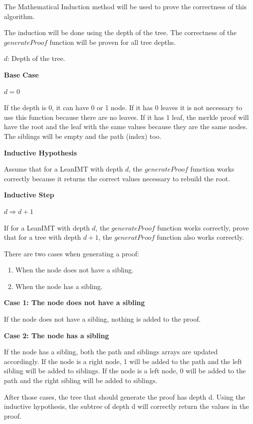 \documentclass{article}
\begin{document}
The Mathematical Induction method will be used to prove the correctness of this algorithm.

The induction will be done using the depth of the tree. The correctness of the $generateProof$ function will be proven for all tree depths.

$d$: Depth of the tree.

\textbf{Base Case}

$d = 0$

If the depth is 0, it can have 0 or 1 node.
If it has 0 leaves it is not necessary to use this function because there are no leaves.
If it has 1 leaf, the merkle proof will have the root and the leaf with the same values because they are the same nodes. The siblings will be empty and the path (index) too.

\textbf{Inductive Hypothesis}

Assume that for a LeanIMT with depth $d$, the $generateProof$ function works correctly because it returns the correct values necessary to rebuild the root.

\textbf{Inductive Step}

$d \Rightarrow d+1$

If for a LeanIMT with depth $d$, the $generateProof$ function works correctly, prove that for a tree with depth $d + 1$, the $generatProof$ function also works correctly.

There are two cases when generating a proof:

\begin{enumerate}
    \item When the node does not have a sibling.
    \item When the node has a sibling.
\end{enumerate}

\textbf{Case 1: The node does not have a sibling}

If the node does not have a sibling, nothing is added to the proof.

\textbf{Case 2: The node has a sibling}

If the node has a sibling, both the path and siblings arrays are updated accordingly.
If the node is a right node, 1 will be added to the path and the left sibling will be added to siblings.
If the node is a left node, 0 will be added to the path and the right sibling will be added to siblings.

After those cases, the tree that should generate the proof has depth d. Using the inductive hypothesis, the subtree of depth d will correctly return the values in the proof.
\end{document}
